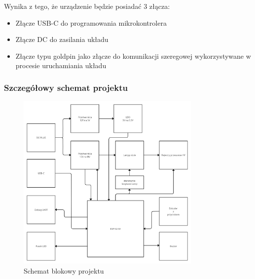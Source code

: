 \documentclass[../main.tex]{subfiles}
\begin{document}
Wynika z tego, że urządzenie będzie posiadać 3 złącza:
\begin{itemize}
    \item Złącze USB-C do programowania mikrokontrolera
    \item Złącze DC do zasilania układu
    \item Złącze typu goldpin jako złącze do komunikacji szeregowej wykorzystywane w procesie uruchamiania układu
\end{itemize}

\subsubsection{Szczegółowy schemat projektu}
\begin{figure}[H]
    \centering
    \includegraphics[width=0.8\textwidth]{schemat_blokowy.jpg}
    \caption{Schemat blokowy projektu}
    \label{fig:schemat_projektu}
\end{figure}
\end{document}
